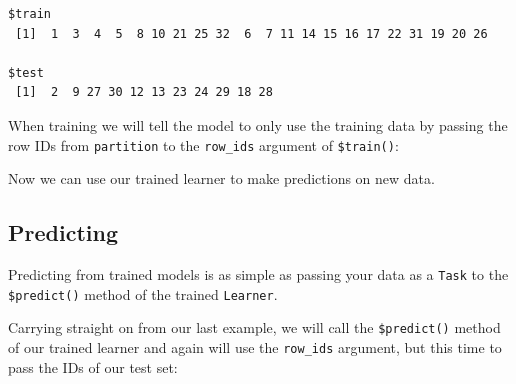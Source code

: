 \begin{Shaded}
\begin{Highlighting}[]
\OtherTok{=} 
\end{Highlighting}
\end{Shaded}

\begin{verbatim}
$train
 [1]  1  3  4  5  8 10 21 25 32  6  7 11 14 15 16 17 22 31 19 20 26

$test
 [1]  2  9 27 30 12 13 23 24 29 18 28
\end{verbatim}

When training we will tell the model to only use the training data by
passing the row IDs from \texttt{partition} to the \texttt{row\_ids}
argument of \texttt{\$train()}:

\begin{Shaded}
\begin{Highlighting}[]
\SpecialCharTok{$}\SpecialCharTok{$}
\end{Highlighting}
\end{Shaded}

Now we can use our trained learner to make predictions on new data.

\hypertarget{sec-predicting}{%
\subsection{Predicting}\label{sec-predicting}}

Predicting from trained models is as simple as passing your data as a
\texttt{Task} to the
\texttt{\$predict()}
method of the trained \texttt{Learner}.

Carrying straight on from our last example, we will call the
\texttt{\$predict()} method of our trained learner and again will use
the \texttt{row\_ids} argument, but this time to pass the IDs of our
test set:

\begin{Shaded}
\begin{Highlighting}[]
\OtherTok{=}\SpecialCharTok{$}\SpecialCharTok{$}
\end{Highlighting}
\end{Shaded}

